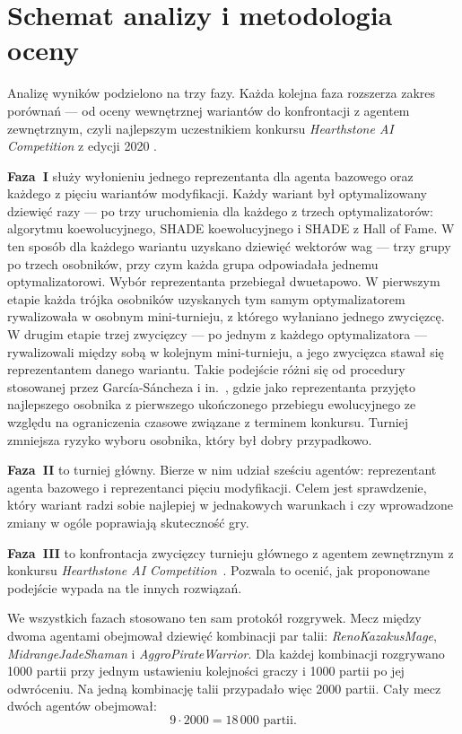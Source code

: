 \section{Schemat analizy i metodologia oceny}
\label{sec:analysis-scheme}

Analizę wyników podzielono na trzy fazy. Każda kolejna faza rozszerza zakres porównań --- od oceny wewnętrznej wariantów do konfrontacji z agentem zewnętrznym, czyli najlepszym uczestnikiem konkursu \textit{Hearthstone AI Competition} z edycji 2020 \cite{hearthstone_competition}.

\textbf{Faza~I} służy wyłonieniu jednego reprezentanta dla agenta bazowego oraz każdego z pięciu wariantów modyfikacji. Każdy wariant był optymalizowany dziewięć razy --- po trzy uruchomienia dla każdego z trzech optymalizatorów: algorytmu koewolucyjnego, SHADE koewolucyjnego i SHADE z Hall of Fame. W ten sposób dla każdego wariantu uzyskano dziewięć wektorów wag --- trzy grupy po trzech osobników, przy czym każda grupa odpowiadała jednemu optymalizatorowi. Wybór reprezentanta przebiegał dwuetapowo. W pierwszym etapie każda trójka osobników uzyskanych tym samym optymalizatorem rywalizowała w osobnym mini-turnieju, z którego wyłaniano jednego zwycięzcę. W drugim etapie trzej zwycięzcy --- po jednym z każdego optymalizatora --- rywalizowali między sobą w kolejnym mini-turnieju, a jego zwycięzca stawał się reprezentantem danego wariantu. Takie podejście różni się od procedury stosowanej przez García-Sáncheza i in.~\cite{sanchez2020}, gdzie jako reprezentanta przyjęto najlepszego osobnika z pierwszego ukończonego przebiegu ewolucyjnego ze względu na ograniczenia czasowe związane z terminem konkursu. Turniej zmniejsza ryzyko wyboru osobnika, który był dobry przypadkowo.

\textbf{Faza~II} to turniej główny. Bierze w nim udział sześciu agentów: reprezentant agenta bazowego i reprezentanci pięciu modyfikacji. Celem jest sprawdzenie, który wariant radzi sobie najlepiej w jednakowych warunkach i czy wprowadzone zmiany w ogóle poprawiają skuteczność gry.

\textbf{Faza~III} to konfrontacja zwycięzcy turnieju głównego z agentem zewnętrznym z konkursu \textit{Hearthstone AI Competition}~\cite{hearthstone_competition}. Pozwala to ocenić, jak proponowane podejście wypada na tle innych rozwiązań.

We wszystkich fazach stosowano ten sam protokół rozgrywek. Mecz między dwoma agentami obejmował dziewięć kombinacji par talii: \textit{RenoKazakusMage}, \textit{MidrangeJadeShaman} i \textit{AggroPirateWarrior}. Dla każdej kombinacji rozgrywano 1000 partii przy jednym ustawieniu kolejności graczy i 1000 partii po jej odwróceniu. Na jedną kombinację talii przypadało więc 2000 partii. Cały mecz dwóch agentów obejmował:
\begin{equation}
    9 \cdot 2000 = 18\,000 \text{ partii.}
    \label{eq:games_per_match}
\end{equation}


